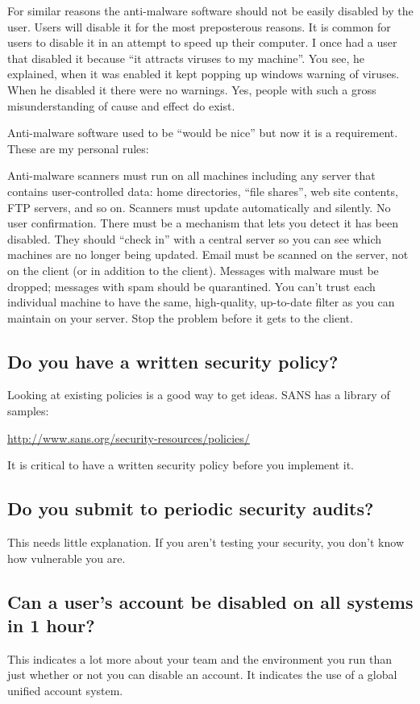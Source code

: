 \documentclass{article}
\begin{document}
For similar reasons the anti-malware software should not be easily disabled by the user. Users will disable it for the most preposterous reasons. It is common for users to disable it in an attempt to speed up their computer. I once had a user that disabled it because ``it attracts viruses to my machine''. You see, he explained, when it was enabled it kept popping up windows warning of viruses. When he disabled it there were no warnings. Yes, people with such a gross misunderstanding of cause and effect do exist.

Anti-malware software used to be ``would be nice'' but now it is a requirement. These are my personal rules:

Anti-malware scanners must run on all machines including any server that contains user-controlled data: home directories, ``file shares'', web site contents, FTP servers, and so on.
Scanners must update automatically and silently. No user confirmation.
There must be a mechanism that lets you detect it has been disabled. They should ``check in'' with a central server so you can see which machines are no longer being updated.
Email must be scanned on the server, not on the client (or in addition to the client). Messages with malware must be dropped; messages with spam should be quarantined. You can't trust each individual machine to have the same, high-quality, up-to-date filter as you can maintain on your server. Stop the problem before it gets to the client.

\subsection{Do you have a written security policy?}
Looking at existing policies is a good way to get ideas. SANS has a library of samples:

\url{http://www.sans.org/security-resources/policies/}

It is critical to have a written security policy before you implement it.

\subsection{Do you submit to periodic security audits?}
This needs little explanation. If you aren't testing your security, you don't know how vulnerable you are.

\subsection{Can a user's account be disabled on all systems in 1 hour?}
This indicates a lot more about your team and the environment you run than just whether or not you can disable an account. It indicates the use of a global unified account system.
\end{document}

